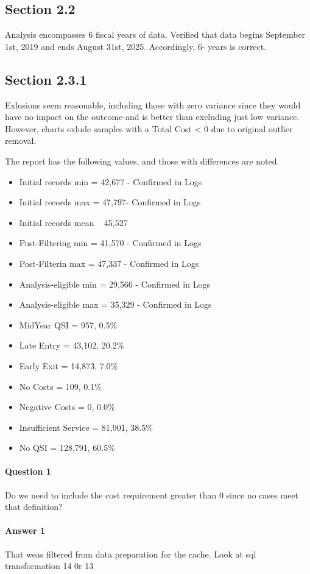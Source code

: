 \documentclass[12pt, letterpaper]{article}
\begin{document}
\subsection{Section 2.2} 
Analysis encompasses 6 fiscal years of data. Verified that data begins September 1st, 2019 and ends August 31st, 2025. Accordingly, 6- years is correct. 
\subsection{Section 2.3.1} 
Exlusions seem reasonable, including those with zero variance since they would have no impact on the outcome-and is better than excluding just low variance. However, charts exlude samples with a Total Cost < 0 due to original outlier removal.

The report has the following values, and those with differences are noted. 
\begin{itemize}
     \item Initial records min = 42,677 - Confirmed in Logs
     \item Initial records max = 47,797- Confirmed in Logs
     \item Initial records mean ~ 45,527
     \item Post-Filtering min = 41,570 - Confirmed in Logs
     \item Post-Filterin max = 47,337 - Confirmed in Logs
     \item Analysis-eligible min = 29,566 - Confirmed in Logs
     \item Analysis-eligible max = 35,329 - Confirmed in Logs
	 \item MidYear QSI = 957, 0.5\%
	 \item Late Entry = 43,102, 20.2\%
	 \item Early Exit = 14,873, 7.0\%
	 \item No Costs = 109, 0.1\%
	 \item Negative Costs = 0, 0.0\%
	 \item Insufficient Service = 81,901, 38.5\%
	 \item No QSI = 128,791, 60.5\%
\end{itemize}

\paragraph{Question 1} Do we need to include the cost requirement greater than 0 since no cases meet that definition?
\paragraph{Answer 1} That weas filtered from data preparation for the cache. Look at sql transformation 14 0r 13
\end{document}
